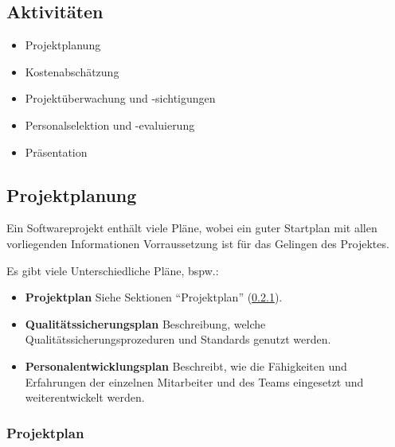 		\subsection{Aktivitäten}
			\begin{itemize}
				\item Projektplanung
				\item Kostenabschätzung
				\item Projektüberwachung und -sichtigungen
				\item Personalselektion und -evaluierung
				\item Präsentation
			\end{itemize}
		
		\subsection{Projektplanung}
			Ein Softwareprojekt enthält viele Pläne, wobei ein guter Startplan mit allen vorliegenden Informationen Vorraussetzung ist für das Gelingen des Projektes.
			
			Es gibt viele Unterschiedliche Pläne, bspw.:
			\begin{itemize}
				\item \textbf{Projektplan} Siehe Sektionen \enquote{Projektplan} (\ref{ssec:projektplan}).
				\item \textbf{Qualitätssicherungsplan} Beschreibung, welche Qualitätssicherungsprozeduren und Standards genutzt werden.
				\item \textbf{Personalentwicklungsplan} Beschreibt, wie die Fähigkeiten und Erfahrungen der einzelnen Mitarbeiter und des Teams eingesetzt und weiterentwickelt werden.
			\end{itemize}
			
			\subsubsection{Projektplan}
				\label{ssec:projektplan}
				
